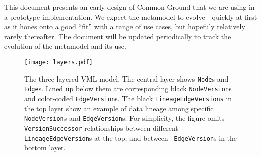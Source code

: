 \documentclass{article}
\newcommand{\vml}{VML\xspace}
\newcommand{\node}{\texttt{Node}\xspace}
\newcommand{\edge}{\texttt{Edge}\xspace}
\begin{document}
This document presents an early design of Common Ground that we are using in a prototype implementation.  We expect the metamodel to evolve---quickly at first as it hones onto a good ``fit'' with a range of use cases, but hopefuly relatively rarely thereafter.  The document will be updated periodically to track the evolution of the metamodel and its use.

\begin{figure}[th]
\centering
\texttt{[image: layers.pdf]}
\caption{The three-layered \vml model.  The central layer shows {\node}s and {\edge}s.  
Lined up below them are corresponding black \texttt{NodeVersion}s and color-coded \texttt{EdgeVersion}s.  
The black \texttt{LineageEdgeVersions} in the top layer show an example of data lineage among specific \texttt{NodeVersion}s and \texttt{EdgeVersion}s.  For simplicity, the figure omits \texttt{VersionSuccessor} relationships between different \texttt{LineageEdgeVersion}s at the top, and between \
\texttt{EdgeVersion}s in the bottom layer.}
\label{fig:layers}
\end{figure}
\end{document}
